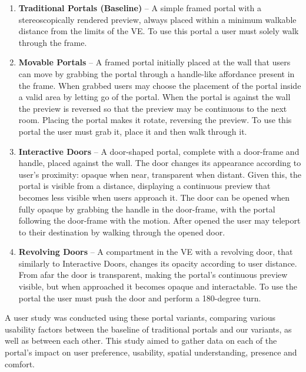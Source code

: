 \begin{enumerate}
    \item \textbf{Traditional Portals (Baseline)} -- A simple framed portal with a stereoscopically rendered preview, always placed within a minimum 
    walkable distance from the limits of the \gls{VE}. To use this portal a user must solely walk through the frame.
    
    \item \textbf{Movable Portals} -- A framed portal initially placed at the wall that users can move by grabbing the portal through a handle-like
    affordance present in the frame. When grabbed users may choose the placement of the portal inside a valid area by letting go of the portal. 
    When the portal is against the wall the preview is reversed so that the preview may be continuous to the next room. Placing the portal makes 
    it rotate, reversing the preview. To use this portal the user must grab it, place it and then walk through it.
    
    \item \textbf{Interactive Doors} -- A door-shaped portal, complete with a door-frame and handle, placed against the wall. The door changes its 
    appearance according to user's proximity: opaque when near, transparent when distant. Given this, the portal is visible from a distance, displaying a
    continuous preview that becomes less visible when users approach it. The door can be opened when fully opaque by grabbing the handle in the door-frame, 
    with the portal following the door-frame with the motion. After opened the user may teleport to their destination by walking through the opened door.
     
    \item \textbf{Revolving Doors} -- A compartment in the \gls{VE} with a revolving door, that similarly to Interactive Doors, changes its opacity 
    according to user distance. From afar the door is transparent, making the portal's continuous preview visible, but when approached it becomes 
    opaque and interactable. To use the portal the user must push the door and perform a 180-degree turn.
\end{enumerate}

A user study was conducted using these portal variants, comparing various usability factors between the baseline of traditional portals and our variants, 
as well as between each other. This study aimed to gather data on each of the portal's impact on user preference, usability, spatial understanding,
presence and comfort. 

